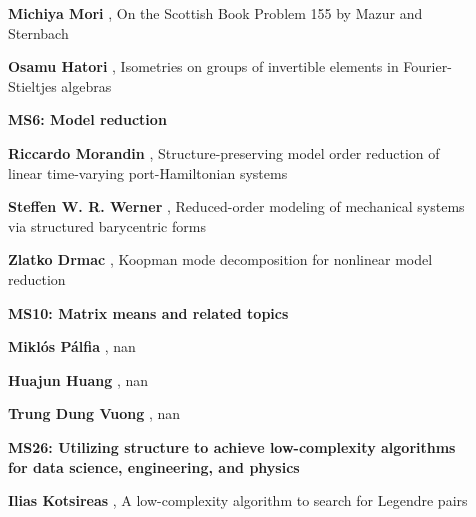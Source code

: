 \documentclass[ILAS2025-program.tex]{subfiles}
\begin{document}
\begin{description}
\begin{description}
        \item[] \textbf{Michiya Mori} , On the Scottish Book Problem 155 by Mazur and Sternbach
        \item[] \textbf{Osamu Hatori} , Isometries on groups of invertible elements in Fourier-Stieltjes algebras
        \end{description}
    \begin{description}
    \item[] {\color{mstitle}\textbf{MS6: Model reduction}} 
    \item[] \textbf{Riccardo Morandin} , Structure-preserving model order reduction of linear time-varying port-Hamiltonian systems
        \item[] \textbf{Steffen W. R. Werner} , Reduced-order modeling of mechanical systems via structured barycentric forms
        \item[] \textbf{Zlatko Drmac} , Koopman mode decomposition for nonlinear model reduction
        \end{description}
    \begin{description}
    \item[] {\color{mstitle}\textbf{MS10: Matrix means and related topics}} 
    \item[] \textbf{Miklós Pálfia} , nan
        \item[] \textbf{Huajun Huang} , nan
        \item[] \textbf{Trung Dung Vuong} , nan
        \end{description}
    \begin{description}
    \item[] {\color{mstitle}\textbf{MS26: Utilizing structure to achieve low-complexity algorithms for data science, engineering, and physics}} 
    \item[] \textbf{Ilias Kotsireas} , A low-complexity algorithm to search for Legendre pairs


\end{description}
\end{description}
\end{document}
